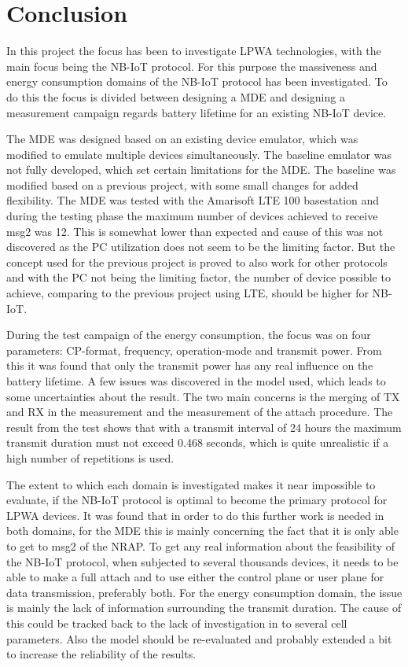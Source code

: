 \chapter{Conclusion}
\label{ch:con}
In this project the focus has been to investigate LPWA technologies, with the main focus being the NB-IoT protocol. For this purpose the massiveness and energy consumption domains of the NB-IoT protocol has been investigated. To do this the focus is divided between designing a MDE and designing a measurement campaign regards battery lifetime for an existing NB-IoT device. 

The MDE was designed based on an existing device emulator, which was modified to emulate multiple devices simultaneously. The baseline emulator was not fully developed, which set certain limitations for the MDE. The baseline was modified based on a previous project, with some small changes for added flexibility. The MDE was tested with the Amarisoft LTE 100 basestation and during the testing phase the maximum number of devices achieved to receive msg2 was 12. This is somewhat lower than expected and cause of this was not discovered as the PC utilization does not seem to be the limiting factor. But the concept used for the previous project is proved to also work for other protocols and with the PC not being the limiting factor, the number of device possible to achieve, comparing to the previous project using LTE, should be higher for NB-IoT.

During the test campaign of the energy consumption, the focus was on four parameters: CP-format, frequency, operation-mode and transmit power. From this it was found that only the transmit power has any real influence on the battery lifetime. A few issues was discovered in the model used, which leads to some uncertainties about the result. The two main concerns is the merging of TX and RX in the measurement and the measurement of the attach procedure. The result from the test shows that with a transmit interval of 24 hours the maximum transmit duration must not exceed 0.468 seconds, which is quite unrealistic if a high number of repetitions is used. 

The extent to which each domain is investigated makes it near impossible to evaluate, if the NB-IoT protocol is optimal to become the primary protocol for LPWA devices. It was found that in order to do this further work is needed in both domains, for the MDE this is mainly concerning the fact that it is only able to get to msg2 of the NRAP. To get any real information about the feasibility of the NB-IoT protocol, when subjected to several thousands devices, it needs to be able to make a full attach and to use either the control plane or user plane for data transmission, preferably both. For the energy consumption domain, the issue is mainly the lack of information surrounding the transmit duration. The cause of this could be tracked back to the lack of investigation in to several cell parameters. Also the model should be re-evaluated and probably extended a bit to increase the reliability of the results. 




